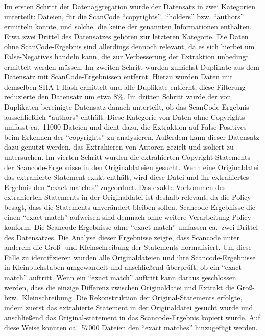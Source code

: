 Im ersten Schritt der Datenaggregation wurde der Datensatz in zwei Kategorien unterteilt: Dateien, für die ScanCode \enquote{copyrights}, \enquote{holders} bzw. \enquote{authors} ermitteln konnte, und solche, die keine der genannten Informationen enthalten.
Etwa zwei Drittel des Datensatzes gehören zur letzteren Kategorie.
Die Daten ohne ScanCode-Ergebnis sind allerdings dennoch relevant, da es sich hierbei um False-Negatives handeln kann, die zur Verbesserung der Extraktion unbedingt ermittelt werden müssen.
Im zweiten Schritt wurden zunächst Duplikate aus dem Datensatz mit ScanCode-Ergebnissen entfernt.
Hierzu wurden Daten mit demselben SHA-1 Hash ermittelt und alle Duplikate entfernt, diese Filterung reduzierte den Datensatz um etwa 8\%.
Im dritten Schritt wurde der von Duplikaten bereinigte Datensatz danach unterteilt, ob das ScanCode Ergebnis ausschließlich \enquote{authors} enthält.
Diese Kategorie von Daten ohne Copyrights umfasst ca.\ 11000 Dateien und dient dazu, die Extraktion auf False-Positives beim Erkennen der \enquote{copyrights} zu analysieren.
Außerdem kann dieser Datensatz dazu genutzt werden, das Extrahieren von Autoren gezielt und isoliert zu untersuchen.
Im vierten Schritt wurden die extrahierten Copyright-Statements der Scancode-Ergebnisse in den Originaldateien gesucht.
Wenn eine Originaldatei das extrahierte Statement exakt enthält, wird diese Datei und ihr extrahiertes Ergebnis den \enquote{exact matches} zugeordnet.
Das exakte Vorkommen des extrahierten Statements in der Originaldatei ist deshalb relevant, da die Policy besagt, dass die Statements unverändert bleiben sollen.
Scancode-Ergebnisse die einen \enquote{exact match} aufweisen sind demnach ohne weitere Verarbeitung Policy-konform.
Die Scancode-Ergebnisse ohne \enquote{exact match} umfassen ca.\ zwei Drittel des Datensatzes.
Die Analyse dieser Ergebnisse zeigte, dass Scancode unter anderem die Groß- und Kleinschreibung der Statements normalisiert.
Um diese Fälle zu identifizieren wurden alle Originaldateien und ihre Scancode-Ergebnisse in Kleinbuchstaben umgewandelt und anschließend überprüft, ob ein \enquote{exact match} auftritt.
Wenn ein \enquote{exact match} auftritt kann daraus geschlossen werden, dass die einzige Differenz zwischen Originaldatei und Extrakt die Groß- bzw.\ Kleinschreibung.
Die Rekonstruktion der Original-Statements erfolgte, indem zuerst das extrahierte Statement in der Originaldatei gesucht wurde und anschließend das Original-statement in das Scancode-Ergebnis kopiert wurde.
Auf diese Weise konnten ca.\ 57000 Dateien den \enquote{exact matches} hinzugefügt werden.

